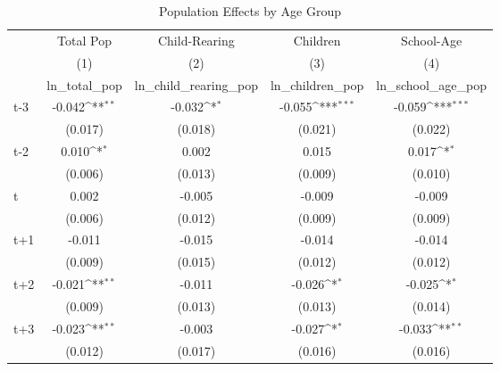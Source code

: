 \begin{table}[htbp]\centering
\def\sym#1{\ifmmode^{#1}\else\(^{#1}\)\fi}
\caption{Population Effects by Age Group}
\begin{tabular}{l*{4}{c}}
\hline\hline
            &\multicolumn{1}{c}{Total Pop}&\multicolumn{1}{c}{Child-Rearing}&\multicolumn{1}{c}{Children}&\multicolumn{1}{c}{School-Age}\\\cmidrule(lr){2-2}\cmidrule(lr){3-3}\cmidrule(lr){4-4}\cmidrule(lr){5-5}
            &\multicolumn{1}{c}{(1)}&\multicolumn{1}{c}{(2)}&\multicolumn{1}{c}{(3)}&\multicolumn{1}{c}{(4)}\\
            &\multicolumn{1}{c}{ln\_total\_pop}&\multicolumn{1}{c}{ln\_child\_rearing\_pop}&\multicolumn{1}{c}{ln\_children\_pop}&\multicolumn{1}{c}{ln\_school\_age\_pop}\\
\hline
t-3         &      -0.042\sym{**} &      -0.032\sym{*}  &      -0.055\sym{***}&      -0.059\sym{***}\\
            &     (0.017)         &     (0.018)         &     (0.021)         &     (0.022)         \\
[1em]
t-2         &       0.010\sym{*}  &       0.002         &       0.015         &       0.017\sym{*}  \\
            &     (0.006)         &     (0.013)         &     (0.009)         &     (0.010)         \\
[1em]
t           &       0.002         &      -0.005         &      -0.009         &      -0.009         \\
            &     (0.006)         &     (0.012)         &     (0.009)         &     (0.009)         \\
[1em]
t+1         &      -0.011         &      -0.015         &      -0.014         &      -0.014         \\
            &     (0.009)         &     (0.015)         &     (0.012)         &     (0.012)         \\
[1em]
t+2         &      -0.021\sym{**} &      -0.011         &      -0.026\sym{*}  &      -0.025\sym{*}  \\
            &     (0.009)         &     (0.013)         &     (0.013)         &     (0.014)         \\
[1em]
t+3         &      -0.023\sym{**} &      -0.003         &      -0.027\sym{*}  &      -0.033\sym{**} \\
            &     (0.012)         &     (0.017)         &     (0.016)         &     (0.016)         \\

\end{tabular}
\end{table}
